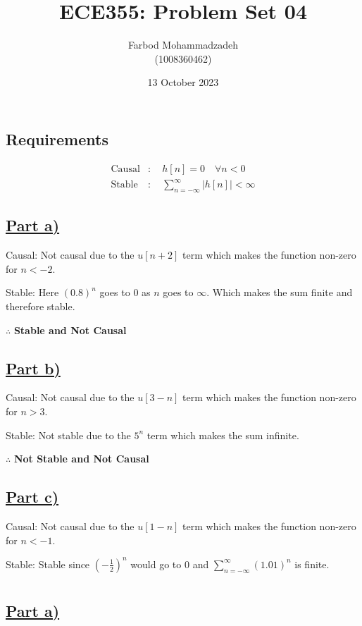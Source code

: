 \documentclass{article}
\title{ECE355: Problem Set 04}
\author{Farbod Mohammadzadeh\\
    (1008360462)}
\date{13 October 2023}
\begin{document}
\Large
\maketitle
\newpage
\section{}
\subsection*{Requirements}
\begin{align}
    \text{Causal} & : \quad h[n] = 0 \quad \forall n < 0 \\
    \text{Stable} & : \quad \sum_{n=-\infty}^{\infty} |h[n]| < \infty
\end{align}
\subsection*{\underline{Part a)}}
Causal: Not causal due to the $u[n+2]$ term which makes the function non-zero for $n < -2$. 

Stable: Here $(0.8)^n$ goes to $0$ as $n$ goes to $\infty$. Which makes the sum finite and therefore stable.

$\therefore$ \textbf{Stable and Not Causal}
\subsection*{\underline{Part b)}}

Causal: Not causal due to the $u[3-n]$ term which makes the function non-zero for $n > 3$.

Stable: Not stable due to the $5^n$ term which makes the sum infinite.

$\therefore$ \textbf{Not Stable and Not Causal}
\subsection*{\underline{Part c)}}

Causal: Not causal due to the $u[1-n]$ term which makes the function non-zero for $n < -1$.

Stable: Stable since $(-\frac{1}{2})^n$ would go to $0$ and $\sum_{n=-\infty}^{\infty} (1.01)^n$ is finite.

\newpage
\section{}
\subsection*{\underline{Part a)}}
\end{document}
